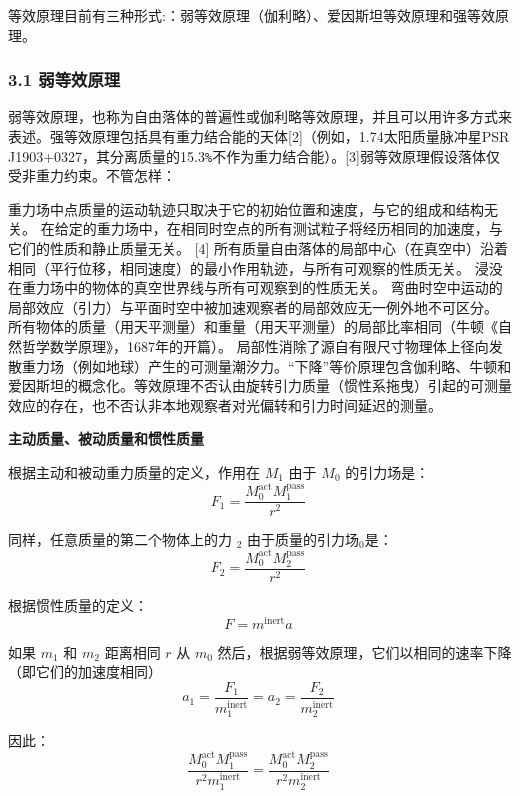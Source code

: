 等效原理目前有三种形式:：弱等效原理（伽利略）、爱因斯坦等效原理和强等效原理。

\subsubsection{3.1 弱等效原理}
弱等效原理，也称为自由落体的普遍性或伽利略等效原理，并且可以用许多方式来表述。强等效原理包括具有重力结合能的天体[2]（例如，1.74太阳质量脉冲星PSR J1903+0327，其分离质量的15.3\verb|%|不作为重力结合能）。[3]弱等效原理假设落体仅受非重力约束。不管怎样：

重力场中点质量的运动轨迹只取决于它的初始位置和速度，与它的组成和结构无关。
在给定的重力场中，在相同时空点的所有测试粒子将经历相同的加速度，与它们的性质和静止质量无关。 [4]
所有质量自由落体的局部中心（在真空中）沿着相同（平行位移，相同速度）的最小作用轨迹，与所有可观察的性质无关。
浸没在重力场中的物体的真空世界线与所有可观察到的性质无关。
弯曲时空中运动的局部效应（引力）与平面时空中被加速观察者的局部效应无一例外地不可区分。
所有物体的质量（用天平测量）和重量（用天平测量）的局部比率相同（牛顿《自然哲学数学原理》，1687年的开篇）。
局部性消除了源自有限尺寸物理体上径向发散重力场（例如地球）产生的可测量潮汐力。“下降”等价原理包含伽利略、牛顿和爱因斯坦的概念化。等效原理不否认由旋转引力质量（惯性系拖曳）引起的可测量效应的存在，也不否认非本地观察者对光偏转和引力时间延迟的测量。

\textbf{主动质量、被动质量和惯性质量}

根据主动和被动重力质量的定义，作用在 $M_1$ 由于 $M_0$ 的引力场是：
\begin{equation}
F_1 = \frac{M_0^{\text{act}} M_1^{\text{pass}}}{r^2}~
\end{equation}

同样，任意质量的第二个物体上的力 $_2$ 由于质量的引力场$_0$是：
\begin{equation}
F_2 = \frac{M_0^{\text{act}} M_2^{\text{pass}}}{r^2}~
\end{equation}

根据惯性质量的定义：
\begin{equation}
F = m^{\text{inert}} a~
\end{equation}

如果 $m_1$ 和 $m_2$ 距离相同 $r$ 从 $m_0$ 然后，根据弱等效原理，它们以相同的速率下降（即它们的加速度相同）
\begin{equation}
a_1 = \frac{F_1}{m_1^{\text{inert}}} = a_2 = \frac{F_2}{m_2^{\text{inert}}}~
\end{equation}

因此：
\begin{equation}
\frac{M_0^{\text{act}} M_1^{\text{pass}}}{r^2 m_1^{\text{inert}}} = \frac{M_0^{\text{act}} M_2^{\text{pass}}}{r^2 m_2^{\text{inert}}}~
\end{equation}

